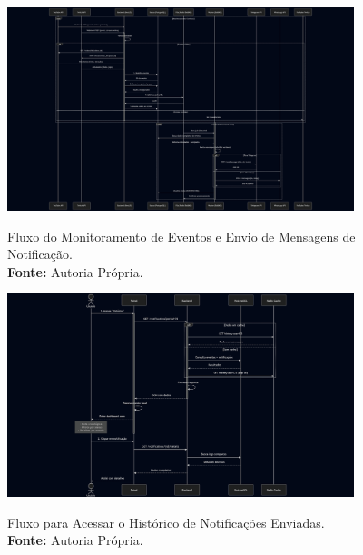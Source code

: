 \begin{enumerate}
        \begin{figure}[!ht]
            \centering     
            \caption{
                Fluxo do Monitoramento de Eventos e Envio de Mensagens de Notificação.\\
                {\footnotesize\textbf{Fonte:} Autoria Própria.}
            }
            \includegraphics[width=0.9\textwidth]{img/Fluxo do Monitoramento de Eventos e Envio de Notificações.png}
            \label{fig:monitoramento}
        \end{figure}
    
        \begin{figure}[!ht]     
            \centering  
            \caption{
                Fluxo para Acessar o Histórico de Notificações Enviadas.\\ {\footnotesize\textbf{Fonte:} Autoria Própria.}
            }
            \includegraphics[width=0.9\textwidth]{img/Fluxo para Acessar o Histórico de Notificações Enviadas.png}
            \label{fig:historico}
        \end{figure}
        

\end{enumerate}
